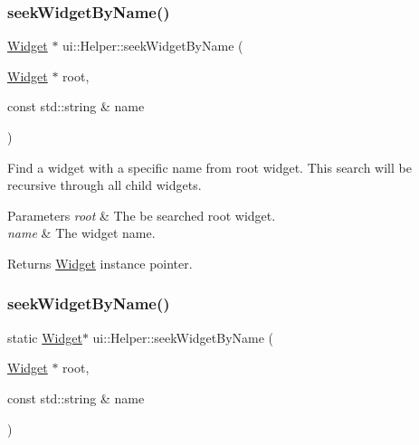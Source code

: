 \subsubsection{\texorpdfstring{seek\+Widget\+By\+Name()}{seekWidgetByName()}\hspace{0.1cm}{\footnotesize\ttfamily [1/2]}}
{\footnotesize\ttfamily \hyperlink{classui_1_1Widget}{Widget} $\ast$ ui\+::\+Helper\+::seek\+Widget\+By\+Name (\begin{DoxyParamCaption}\item[{\hyperlink{classui_1_1Widget}{Widget} $\ast$}]{root,  }\item[{const std\+::string \&}]{name }\end{DoxyParamCaption})\hspace{0.3cm}{\ttfamily [static]}}

Find a widget with a specific name from root widget. This search will be recursive through all child widgets.


\begin{DoxyParams}{Parameters}
{\em root} & The be searched root widget. \\
\hline
{\em name} & The widget name. \\
\hline
\end{DoxyParams}
\begin{DoxyReturn}{Returns}
\hyperlink{classui_1_1Widget}{Widget} instance pointer. 
\end{DoxyReturn}
\mbox{\label{classui_1_1Helper_a1fefc2a4131288652eb3cd689ac36c76}} 
\subsubsection{\texorpdfstring{seek\+Widget\+By\+Name()}{seekWidgetByName()}\hspace{0.1cm}{\footnotesize\ttfamily [2/2]}}
{\footnotesize\ttfamily static \hyperlink{classui_1_1Widget}{Widget}$\ast$ ui\+::\+Helper\+::seek\+Widget\+By\+Name (\begin{DoxyParamCaption}\item[{\hyperlink{classui_1_1Widget}{Widget} $\ast$}]{root,  }\item[{const std\+::string \&}]{name }\end{DoxyParamCaption})\hspace{0.3cm}{\ttfamily [static]}}

